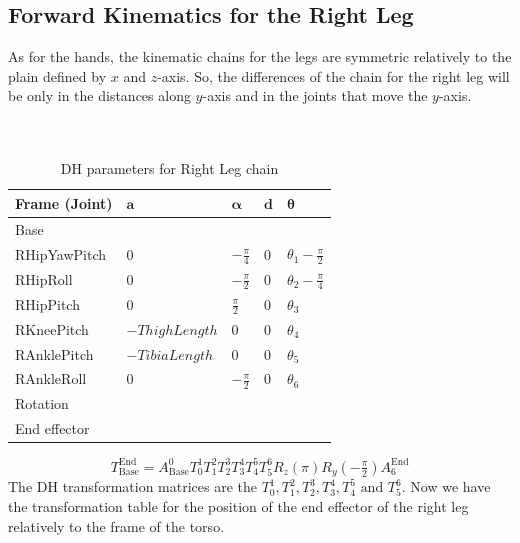 \subsection{Forward Kinematics for the Right Leg}
As for the hands, the kinematic chains for the legs are symmetric relatively to the plain defined by \(x\) and \(z\)-axis. So, the differences of the chain for the right leg will be only in the distances along \(y\)-axis and in the joints that move the \(y\)-axis.
\\
\\
\\
\begin{table}[!h]
\centering
\begin{tabular}{|l|>{\centering\arraybackslash}m{2.55cm}|>{\centering\arraybackslash}m{2.55cm}|>{\centering\arraybackslash}m{2.55cm}|>{\centering\arraybackslash}m{2.55cm}|}
\hline
\textbf{Frame (Joint)} & \(\mathbf{a}\) & \(\boldsymbol{\alpha}\) & \(\mathbf{d}\) & \(\boldsymbol{\theta}\)\\ \hline
Base & \multicolumn{4}{|c|}{\(A(0,\text{\footnotesize{-HipOffsetY}},\text{\footnotesize{-HipOffsetZ}})\)} \\ \hline
RHipYawPitch & \(0\) & \(-\frac{\pi}{4}\) & \(0\) & \(\theta_1 - \frac{\pi}{2}\) \\ \hline
RHipRoll & \(0\) & \(-\frac{\pi}{2}\) & \(0\) & \(\theta_2 - \frac{\pi}{4}\) \\ \hline
RHipPitch & \(0\) & \(\frac{\pi}{2}\) & \(0\) & \(\theta_3\) \\ \hline
RKneePitch & \(-ThighLength\) & \(0\) & \(0\) & \(\theta_4\) \\ \hline
RAnklePitch & \(-TibiaLength\) & \(0\) & \(0\) & \(\theta_5\) \\ \hline
RAnkleRoll & \(0\) & \(-\frac{\pi}{2}\) & \(0\) & \(\theta_6\) \\ \hline
Rotation & \multicolumn{4}{c|}{\(R_z(\pi)R_y(-\tfrac{\pi}{2})\)} \\ \hline
End effector & \multicolumn{4}{c|}{\(A(0,0,\text{\footnotesize{-FootHeight}})\)} \\ \hline
\end{tabular}
\caption{DH parameters for Right Leg chain}
\label{tab:DH parameters for Right Leg chain}
\end{table}
\[
T^\text{End}_\text{Base} = A^0_\text{Base}T^1_0T^2_1T^3_2T^4_3T^5_4T^6_5R_z(\pi)R_y(-\tfrac{\pi}{2})A^\text{End}_{6}
\]
The DH transformation matrices are the \(T^1_0,T^2_1,T^3_2,T^4_3,T^5_4\text{ and }T^6_5\). Now we have the transformation table for the position of the end effector of the right leg relatively to the frame of the torso.

